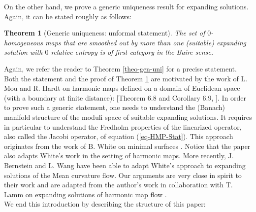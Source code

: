 \documentclass[a4paper,11pt,reqno]{amsart}
\newtheorem{theo}[defn]{Theorem}
\begin{document}
 
On the other hand, we prove a generic uniqueness result for expanding solutions. Again, it can be stated roughly as follows:
\begin{theo}[Generic uniqueness: unformal statement]\label{rough-sta-gen-uni-intro}
The set of $0$-homogeneous maps that are smoothed out by more than one (suitable) expanding solution with $0$ relative entropy is of first category in the Baire sense. 
\end{theo}
Again, we refer the reader to Theorem \ref{theo-gen-uni} for a precise statement. Both the statement and the proof of Theorem \ref{rough-sta-gen-uni-intro} are motivated by the work of L. Mou and R. Hardt on harmonic maps defined on a domain of Euclidean space (with a boundary at finite distance): [Theorem $6.8$ and Corollary $6.9$, \cite{Har-Mou}]. In order to prove such a generic statement, one needs to understand the (Banach) manifold structure of the moduli space of suitable expanding solutions. It requires in particular to understand the Fredholm properties of the linearized operator, also called the Jacobi operator, of equation (\ref{eq-HMP-Stat}). This approach originates from the work of B. White on minimal surfaces \cite{White-var-met}. Notice that the paper \cite{Har-Mou} also adapts White's work in the setting of harmonic maps. More recently, J. Bernstein and L. Wang \cite{Ber-Wan-MCF} have been able to adapt White's approach to expanding solutions of the Mean curvature flow. Our arguments are very close in spirit to their work and are adapted from the author's work in collaboration with T. Lamm on expanding solutions of harmonic map flow \cite{Der-Lam-HMF}.  \\


We end this introduction by describing the structure of this paper:\\
\end{document}
